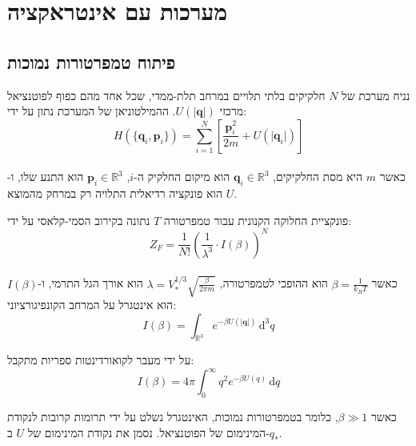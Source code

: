 \documentclass{tstextbook}
\begin{document}
\chapter{מערכות עם אינטראקציה}

\section{פיתוח טמפרטורות נמוכות}

\begin{definition}
נניח מערכת של \(N\) חלקיקים בלתי תלויים במרחב תלת-ממדי, שכל אחד מהם כפוף לפוטנציאל מרכזי \(U(\lvert \mathbf{q} \rvert)\). ההמילטוניאן של המערכת נתון על ידי:\\
$$H(\{\mathbf{q}_i, \mathbf{p}_i\}) = \sum_{i=1}^{N} \left[ \frac{\mathbf{p}_i^2}{2m} + U(\lvert \mathbf{q}_i \rvert) \right]
$$\\

כאשר \(m\) היא מסת החלקיקים, \(\mathbf{q}_i \in \mathbb{R}^3\) הוא מיקום החלקיק ה-\(i\), \(\mathbf{p}_i \in \mathbb{R}^3\) הוא התנע שלו, ו-\(U\) הוא פונקציה רדיאלית התלויה רק במרחק מהמוצא.

\end{definition}
\begin{definition}
פונקציית החלוקה הקנונית עבור טמפרטורה \(T\) נתונה בקירוב הסמי-קלאסי על ידי:\\
$$Z_{F} = \frac{1}{N!} \left( \frac{1}{\lambda^3} \cdot I(\beta) \right)^N
$$\\

כאשר \(\beta = \frac{1}{k_B T}\) הוא ההופכי לטמפרטורה, \(\lambda = V_{*}^{1/3} \sqrt{ \frac{\beta}{2\pi m} }\) הוא אורך הגל התרמי, ו-\(I(\beta)\) הוא אינטגרל על המרחב הקונפיגורציוני:\\
$$I(\beta) = \int_{\mathbb{R}^3} e^{ -\beta U(\lvert \mathbf{q} \rvert) } \, \mathrm{d}^3 q
$$

\end{definition}
\begin{proposition}
על ידי מעבר לקואורדינטות ספריות מתקבל:\\
$$I(\beta) = 4\pi \int_0^\infty q^2 e^{ -\beta U(q) } \, \mathrm{d}q
$$

\end{proposition}
\begin{remark}
כאשר \(\beta \gg 1\), כלומר בטמפרטורות נמוכות, האינטגרל נשלט על ידי תרומות קרובות לנקודת המינימום של הפוטנציאל. נסמן את נקודת המינימום של \(U\) ב-\(q_*\).

\end{remark}
\end{document}

